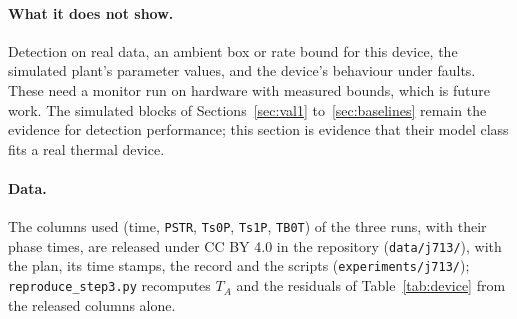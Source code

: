 \paragraph{What it does not show.} Detection on real data, an ambient box or rate bound for this device, the
simulated plant's parameter values, and the device's behaviour under faults. These need a monitor run on hardware
with measured bounds, which is future work. The simulated blocks of Sections~\ref{sec:val1} to~\ref{sec:baselines}
remain the evidence for detection performance; this section is evidence that their model class fits a real
thermal device.

\paragraph{Data.} The columns used (time, \texttt{PSTR}, \texttt{Ts0P}, \texttt{Ts1P}, \texttt{TB0T}) of the three
runs, with their phase times, are released under CC BY 4.0 in the repository (\texttt{data/j713/}), with the plan,
its time stamps, the record and the scripts (\texttt{experiments/j713/}); \texttt{reproduce\_step3.py} recomputes $T_A$ and the
residuals of Table~\ref{tab:device} from the released columns alone.
